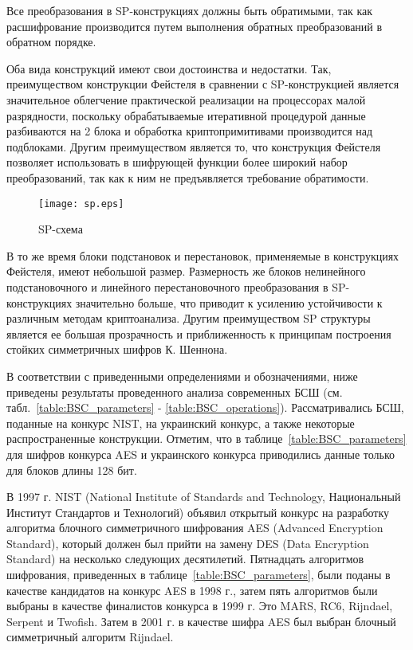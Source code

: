 Все преобразования в SP-конструкциях должны быть обратимыми, так как
расшифрование производится путем выполнения обратных преобразований в обратном
порядке.

Оба вида  конструкций имеют свои достоинства и недостатки. Так, преимуществом
конструкции Фейстеля в сравнении с SP-конструкцией является значительное
облегчение практической реализации на процессорах малой разрядности, поскольку
обрабатываемые итеративной процедурой данные разбиваются на 2 блока и обработка
криптопримитивами производится над подблоками. Другим преимуществом является то,
что конструкция Фейстеля позволяет использовать в шифрующей функции более
широкий набор преобразований, так как к ним не предъявляется требование
обратимости.

\begin{figure}
    \centering\texttt{[image: sp.eps]}
    \caption{SP-схема}
    \label{fig:SP}
\end{figure}

В то же время блоки подстановок и перестановок, применяемые в конструкциях
Фейстеля, имеют небольшой размер. Размерность же блоков нелинейного
подстановочного и линейного перестановочного преобразования в SP-конструкциях
значительно больше, что приводит к усилению устойчивости к различным методам
криптоанализа. Другим преимуществом SP структуры является ее большая
прозрачность и приближенность к принципам построения стойких симметричных шифров
К. Шеннона.

В соответствии с приведенными определениями и обозначениями, ниже приведены
результаты проведенного анализа современных БСШ (см.
табл.~\ref{table:BSC_parameters} - \ref{table:BSC_operations}). Рассматривались
БСШ, поданные на конкурс  NIST, на украинский конкурс, а также некоторые
распространенные конструкции. Отметим, что в таблице~\ref{table:BSC_parameters}
для шифров конкурса AES и украинского конкурса приводились данные только для
блоков длины 128 бит.

В 1997 г. NIST (National Institute of Standards and Technology, Национальный
Институт Стандартов и Технологий) объявил открытый конкурс на разработку
алгоритма блочного симметричного шифрования AES (Advanced Encryption Standard),
который должен был прийти на замену  DES (Data Encryption Standard) на несколько
следующих десятилетий. Пятнадцать алгоритмов шифрования, приведенных в
таблице~\ref{table:BSC_parameters}, были поданы в качестве кандидатов на конкурс
AES в 1998 г., затем пять алгоритмов были выбраны в качестве финалистов конкурса
в 1999 г.  Это MARS, RC6, Rijndael, Serpent и Twofish. Затем в 2001 г. в
качестве шифра AES был выбран блочный симметричный алгоритм Rijndael.

